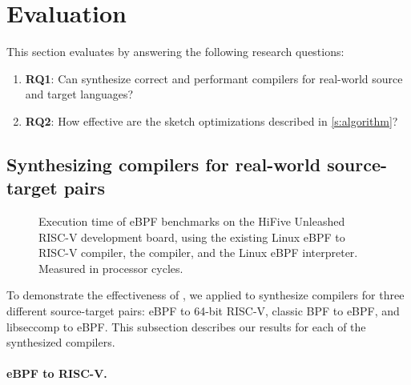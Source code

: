 \section{Evaluation}\label{s:eval}

This section evaluates \jitsynth by answering the following research questions:
\begin{enumerate}[label={},leftmargin=0em]
  \item \textbf{RQ1}: Can \jitsynth synthesize correct and performant compilers for
  real-world source and target languages?
  \item \textbf{RQ2}: How effective are the sketch optimizations described in \autoref{s:algorithm}?
\end{enumerate}


\subsection{Synthesizing compilers for real-world source-target pairs}

%   
%   

\begin{figure}[h]
  \resizebox{\textwidth}{!}{
  
  }
  \caption{Execution time of eBPF benchmarks on the HiFive Unleashed
  RISC-V development board, using the existing Linux eBPF to RISC-V
  compiler, the \jitsynth compiler, and the Linux eBPF interpreter.
  Measured in processor cycles.}
  \label{fig:b2r-runtime}
\end{figure}

To demonstrate the effectiveness of \jitsynth,
we applied \jitsynth to synthesize compilers for three different
source-target pairs: eBPF to 64-bit RISC-V, classic BPF to eBPF,
and libseccomp to eBPF.
%
This subsection describes our results for each of the synthesized
compilers.
%


\paragraph{eBPF to RISC-V.}

